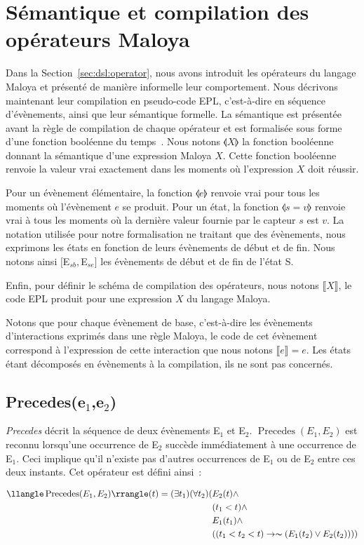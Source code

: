 \section{Sémantique et compilation des opérateurs Maloya}
Dans la Section~\ref{sec:dsl:operator}, nous avons introduit les opérateurs du langage Maloya et présenté de manière informelle leur comportement. Nous décrivons maintenant leur compilation en pseudo-code EPL, c'est-à-dire en séquence d'évènements, ainsi que leur sémantique formelle. La sémantique est présentée avant la règle de compilation de chaque opérateur et est formalisée sous forme d'une fonction booléenne du temps~. Nous notons $\llangle X\rrangle$ la fonction booléenne donnant la sémantique d'une expression Maloya $X$.  Cette fonction booléenne renvoie la valeur vrai exactement dans les moments où l'expression $X$ doit réussir.

Pour un évènement élémentaire, la fonction $\llangle e\rrangle$ renvoie vrai pour tous les moments où l'évènement $e$ se produit. Pour un état, la fonction $\llangle s=v\rrangle$ renvoie vrai à tous les moments où la dernière valeur fournie par le capteur $s$ est $v$.
La notation utilisée pour notre formalisation ne traitant que des évènements, nous exprimons les états en fonction de leurs évènements de début et de fin. Nous notons ainsi $[$E$_{sb},$E$_{se}]$ les évènements de début et de fin de l'état S.%

Enfin, pour définir le schéma de compilation des opérateurs, nous notons $\llbracket X\rrbracket$, le code EPL produit pour une expression $X$ du langage Maloya.

Notons que pour chaque évènement de base, c'est-à-dire les évènements d'interactions exprimés dans une règle Maloya, le code de cet évènement correspond à l'expression de cette interaction que nous notons $\llbracket e\rrbracket=e$. Les états étant décomposés en évènements à la compilation, ils ne sont pas concernés.

\subsection*{Precedes(e$_1$,e$_2$)}
{\em Precedes} décrit la séquence de deux évènements E$_1$ et E$_2$. 
$\operatorname{Precedes}(E_1,E_2)$ est reconnu lorsqu'une occurrence de E$_2$ succède immédiatement à une occurrence de E$_1$. Ceci implique qu'il n'existe pas d'autres occurrences de E$_1$ ou de E$_2$ entre ces deux instants. Cet opérateur est défini ainsi~:
\begin{small}
\begin{equation*}
\begin{split}
\llangle\operatorname{Precedes}(E_1,E_2)\rrangle(t)=(\exists t_1)(\forall t_2)(&E_2(t)\wedge \\
&(t_1<t)\wedge\\
&E_1(t_1)\wedge\\
&((t_1<t_2<t)\rightarrow \thicksim (E_1(t_2)\vee E_2(t_2))))
\end{split}
\end{equation*}
\end{small}

